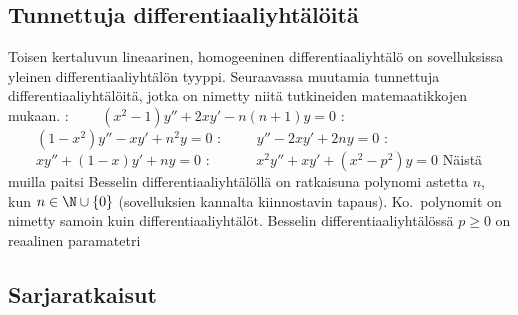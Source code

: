 \subsection*{Tunnettuja differentiaaliyhtälöitä}

Toisen kertaluvun lineaarinen, homogeeninen differentiaaliyhtälö on sovelluksissa yleinen
differentiaaliyhtälön tyyppi. Seuraavassa muutamia tunnettuja differentiaaliyhtälöitä, jotka on
nimetty niitä tutkineiden matemaatikkojen mukaan.
%
\vspace{3mm}\newline
{}: $\qquad(x^2-1)y''+2xy'-n(n+1)y=0$ \vspace{3mm}\newline
{}: $\qquad (1-x^2)y''-xy'+n^2y=0$ \vspace{3mm}\newline
{}: $\qquad\ y''-2xy'+2ny=0$ \vspace{3mm}\newline
{}: $\qquad xy''+(1-x)y'+ny=0$ \vspace{3mm}\newline
{}: $\quad\qquad x^2y''+xy'+(x^2-p^2)y=0$ \vspace{3mm}\newline
Näistä muilla paitsi Besselin differentiaaliyhtälöllä on ratkaisuna polynomi astetta $n$, kun
$n\in\N\cup\{0\}$ (sovelluksien kannalta kiinnostavin tapaus). Ko.\ polynomit on nimetty
samoin kuin differentiaaliyhtälöt. Besselin differentiaaliyhtälössä $p \ge 0$ on reaalinen
paramatetri

\subsection*{Sarjaratkaisut}

